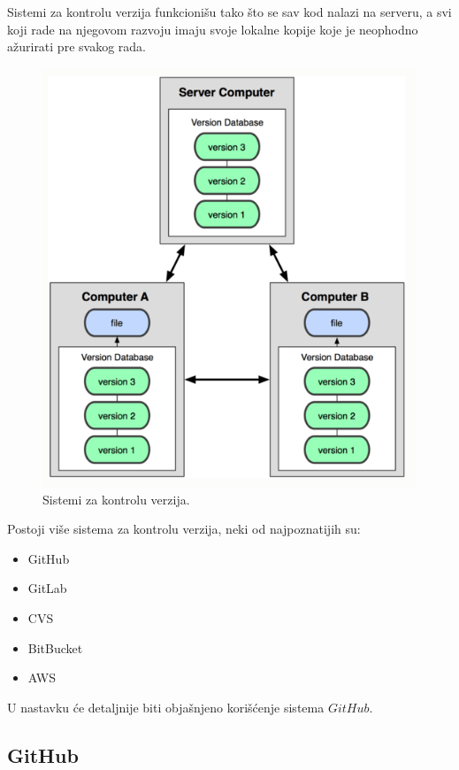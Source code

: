 Sistemi za kontrolu verzija funkcionišu tako što se sav kod nalazi na serveru, a svi koji rade na njegovom razvoju imaju svoje lokalne kopije koje je neophodno ažurirati pre svakog rada.
\begin{figure}[h!]
\begin{center}
\includegraphics[scale=0.5]{pictures/vcs.png}
\end{center}
\caption{Sistemi za kontrolu verzija.}
\label{fig:storage}
\end{figure}

Postoji više sistema za kontrolu verzija, neki od najpoznatijih su:
\begin{itemize}
\item GitHub
\item GitLab
\item CVS
\item BitBucket
\item AWS
\end{itemize}  

U nastavku će detaljnije biti objašnjeno korišćenje sistema $GitHub$.

\subsection{GitHub}

